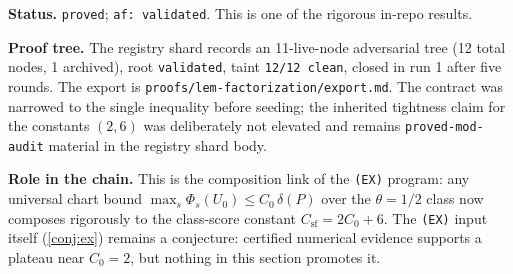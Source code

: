 \noindent\textbf{Status.} \texttt{proved}; \texttt{af: validated}.
This is one of the rigorous in-repo results.

\noindent\textbf{Proof tree.} The registry shard records an 11-live-node
adversarial tree (12 total nodes, 1 archived), root \texttt{validated},
taint \texttt{12/12 clean}, closed in run 1 after five rounds.  The
export is \texttt{proofs/lem-factorization/export.md}.  The contract was
narrowed to the single inequality before seeding; the inherited
tightness claim for the constants $(2,6)$ was deliberately not elevated
and remains \texttt{proved-mod-audit} material in the registry shard
body.

\noindent\textbf{Role in the chain.} This is the composition link of
the \texttt{(EX)} program: any universal chart bound
$\max_s \Phi_s(U_0) \le C_0\,\delta(P)$ over the $\theta=1/2$ class now
composes rigorously to the class-score constant $C_{\mathrm{sf}} =
2C_0 + 6$.  The \texttt{(EX)} input itself (\ref{conj:ex}) remains a
conjecture: certified numerical evidence supports a plateau near
$C_0 = 2$, but nothing in this section promotes it.
